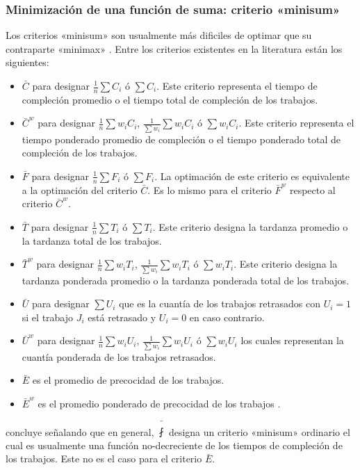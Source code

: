 \documentclass[spanish,draft,12pt,headsepline,footsepline,paper=letter]{scrreprt}
\begin{document}
\subsubsection[Criterio «minisum»]{Minimización de una función de suma: criterio «minisum»}

Los criterios «minisum» son usualmente más dificiles de optimar que su contraparte «minimax» \citep[p.~13]{TKindt2002}. Entre los criterios existentes en la literatura están los siguientes:

\begin{itemize}
  \item $\bar{C}$ para designar $\frac{1}{n}\sum C_i$ ó $\sum C_i$. Este criterio representa el tiempo de compleción promedio o el tiempo total de compleción de los trabajos.
  \item $\bar{C}^w$ para designar $\frac{1}{n} \sum w_iC_i$, $\frac{1}{\sum w_i}\sum w_iC_i$ ó $\sum w_iC_i$. Este criterio representa el tiempo ponderado promedio de compleción o el tiempo ponderado total de compleción de los trabajos.
  \item $\bar{F}$ para designar $ \frac{1}{n}\sum F_i $ ó $\sum F_i$. La optimación de este criterio es equivalente a la optimación del criterio $\bar{C}$. Es lo mismo para el criterio $\bar{F}^w$ respecto al criterio $\bar{C}^w$.
  \item $\bar{T}$ para designar $\frac{1}{n}\sum T_i$ ó $\sum T_i$. Este criterio designa la tardanza promedio o la tardanza total de los trabajos.
  \item $\bar{T}^w$ para designar $\frac{1}{n}\sum w_iT_i$, $\frac{1}{\sum w_i}\sum w_iT_i$ ó $\sum w_iT_i$. Este criterio designa la tardanza ponderada promedio o la tardanza ponderada total de los trabajos.
  \item $\bar{U}$ para designar $\sum U_i$ que es la cuantía de los trabajos retrasados con $U_i=1$ si el trabajo $J_i$ está retrasado y $U_i=0$ en caso contrario.
  \item $\bar{U}^w$ para designar $\frac{1}{n}\sum w_iU_i$, $\frac{1}{\sum w_i}\sum w_iU_i$ ó $\sum w_iU_i$ los cuales representan la cuantía ponderada de los trabajos retrasados.
  \item $\bar{E}$ es el promedio de precocidad de los trabajos.
  \item $\bar{E}^w$ es el promedio ponderado de precocidad de los trabajos \citep[p.~14]{TKindt2002}.
\end{itemize}

\citet[p.~14]{TKindt2002} concluye señalando que en general, $\bar{\fint}$ designa un criterio «minisum» ordinario el cual es usualmente una función no\nobreakdash-decreciente de los tiempos de compleción de los trabajos. Este no es el caso para el criterio $\bar{E}$.
\end{document}
